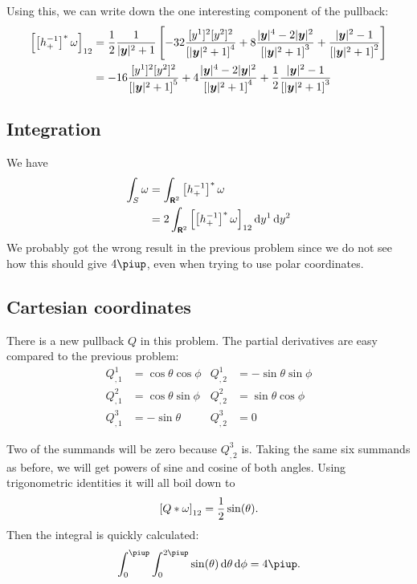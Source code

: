 \documentclass[11pt, english, fleqn, DIV=15, headinclude, BCOR=1cm]{scrartcl}
\begin{document}
Using this, we can write down the one interesting component of the pullback:
\begin{align*}
    \left[ \left[ h_+^{-1} \right]^* \omega \right]_{12}
    &= \frac12 \frac{1}{|\boldsymbol{y}|^2 + 1}
    \left[ 
        - 32 \frac{[y^1]^2 [y^2]^2}{\left[ |\boldsymbol{y}|^2 + 1 \right]^4}
        + 8 \frac{|\boldsymbol{y}|^4 - 2 |\boldsymbol{y}|^2}{\left[ |\boldsymbol{y}|^2 + 1 \right]^3}
        + \frac{|\boldsymbol{y}|^2 - 1}{\left[ |\boldsymbol{y}|^2 + 1 \right]^2}
     \right] \\
    &= 
    - 16 \frac{[y^1]^2 [y^2]^2}{\left[ |\boldsymbol{y}|^2 + 1 \right]^5}
    + 4 \frac{|\boldsymbol{y}|^4 - 2 |\boldsymbol{y}|^2}{\left[ |\boldsymbol{y}|^2 + 1 \right]^4}
    + \frac 12 \frac{|\boldsymbol{y}|^2 - 1}{\left[ |\boldsymbol{y}|^2 + 1 \right]^3}
\end{align*}

\subsection{Integration}

We have
\begin{align*}
    \int_S \omega
    &= \int_{\text{\bfseries\sffamily R}^2} \left[ h_+^{-1} \right]^* \omega \\
    &= 2 \int_{\text{\bfseries\sffamily R}^2} \left[ \left[ h_+^{-1} \right]^* \omega \right]_{12} \mathop{}\!\mathrm d y^1 \mathop{}\!\mathrm d y^2
\end{align*}
We probably got the wrong result in the previous problem since we do not see
how this should give $4 \piup$, even when trying to use polar coordinates.

\subsection{Cartesian coordinates}

There is a new pullback $Q$ in this problem. The partial derivatives are easy
compared to the previous problem:
\begin{align*}
    Q^1_{,1} &= \cos\theta \cos\phi & Q^1_{,2} &= - \sin\theta \sin\phi \\
    Q^2_{,1} &= \cos\theta \sin\phi & Q^2_{,2} &= \sin\theta \cos\phi \\
    Q^3_{,1} &= - \sin\theta & Q^3_{,2} &= 0
\end{align*}

Two of the summands will be zero because $Q^3_{,2}$ is. Taking the same six
summands as before, we will get powers of sine and cosine of both angles. Using
trigonometric identities it will all boil down to
\[
    \left[ Q*\omega \right]_{12} = \frac 12 \sin(\theta).
\]
Then the integral is quickly calculated:
\[
    \int_0^\piup \int_0^{2\piup} \sin(\theta) \dif \theta \dif \phi = 4 \piup.
\]
\end{document}
